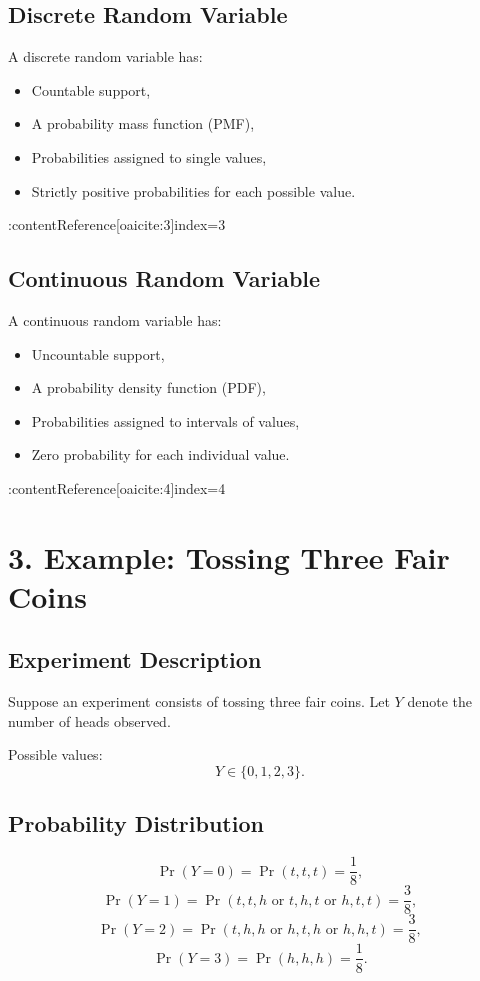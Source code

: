 \documentclass[11pt]{article}
\begin{document}
\subsection*{Discrete Random Variable}
A discrete random variable has:
\begin{itemize}
\item Countable support,
\item A probability mass function (PMF),
\item Probabilities assigned to single values,
\item Strictly positive probabilities for each possible value.
\end{itemize} :contentReference[oaicite:3]{index=3}

\subsection*{Continuous Random Variable}
A continuous random variable has:
\begin{itemize}
\item Uncountable support,
\item A probability density function (PDF),
\item Probabilities assigned to intervals of values,
\item Zero probability for each individual value.
\end{itemize} :contentReference[oaicite:4]{index=4}

\section*{3. Example: Tossing Three Fair Coins}

\subsection*{Experiment Description}
Suppose an experiment consists of tossing three fair coins.  
Let $Y$ denote the number of heads observed.

Possible values:
\[
Y \in \{0,1,2,3\}.
\]

\subsection*{Probability Distribution}
\[
\Pr(Y=0)=\Pr(t,t,t)=\frac{1}{8},
\]
\[
\Pr(Y=1)=\Pr(t,t,h \text{ or } t,h,t \text{ or } h,t,t)=\frac{3}{8},
\]
\[
\Pr(Y=2)=\Pr(t,h,h \text{ or } h,t,h \text{ or } h,h,t)=\frac{3}{8},
\]
\[
\Pr(Y=3)=\Pr(h,h,h)=\frac{1}{8}.
\]
\end{document}
